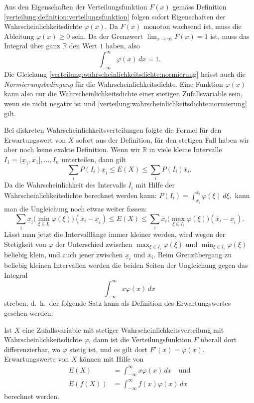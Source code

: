 Aus den Eigenschaften der Verteilungsfunktion $F(x)$
gemäss Definition \ref{verteilung:definition:verteilungsfunktion}
folgen sofort Eigenschaften der Wahrscheinlichkeitsdichte $\varphi(x)$.
Da $F(x)$ monoton wachsend ist, muss die Ableitung $\varphi(x)\ge 0$
sein.
Da der Grenzwert $\lim_{x\to\infty}F(x)=1$ ist, muss das Integral
über ganz $\mathbb{R}$ den Wert $1$ haben, also
\begin{equation}
\int_{-\infty}^\infty \varphi(x)\,dx = 1.
\label{verteilung:wahrscheinlichkeitsdichte:normierung}
\end{equation}
Die Gleichung \eqref{verteilung:wahrscheinlichkeitsdichte:normierung}
heisst auch die {\em Normierungsbedingung} für die Wahrscheinlichkeitsdichte.
Eine Funktion $\varphi(x)$ kann also nur die Wahrscheinlichkeitsdichte
einer stetigen Zufallsvariable sein, wenn sie nicht negativ ist und
\eqref{verteilung:wahrscheinlichkeitsdichte:normierung} gilt.

Bei diskreten Wahrscheinlichkeitsverteilungen folgte die Formel für den
Erwartungswert von $X$ sofort aus der Definition, für den stetigen
Fall haben wir aber noch keine exakte Definition.
Wenn wir $\mathbb{R}$
in viele kleine Intervalle $I_1=(\underline x_1,\overline x_1],\dots, I_n$
unterteilen, dann gilt
\[
\sum_{i}P(I_i)\underline x_i\le
E(X)
\le
\sum_{i}P(I_i)\overline x_i.
\]
Da die Wahrscheinlichkeit des Intervalls $I_i$ mit Hilfe der
Wahrscheinlichkeitsdichte berechnet werden kann:
$P(I_i)=\int_{\underline x_i}^{\overline x_i}\varphi(\xi)\,d\xi,$
kann man die Ungleichung noch etwas weiter fassen:
\[
\sum_{i}\underline x_i\bigl(\min_{\xi\in I_i}\varphi(\xi)\bigr)(\overline x_i-\underline x_i)\le
E(X)
\le
\sum_{i}\overline x_i\bigl(\max_{\xi\in I_i}\varphi(\xi)\bigr)(\overline x_i-\underline x_i).
\]
Lässt man jetzt die Intervalllänge immer kleiner werden, wird wegen der
Stetigkeit von $\varphi$ der Unterschied zwischen
$\max_{\xi\in I_i}\varphi(\xi)$ und
$\min_{\xi\in I_i}\varphi(\xi)$ beliebig klein, und auch jener
zwischen $\underline x_i$ und $\overline x_i$.
Beim Grenzübergang
zu beliebig kleinen Intervallen werden die beiden Seiten der Ungleichung
gegen das Integral
\[
\int_{-\infty}^{\infty}x\varphi(x)\,dx
\]
streben, d.~h.~der folgende Satz kann als Definition des Erwartungswertes
gesehen werden:
\begin{satz}
Ist $X$ eine Zufallsvariable mit stetiger
Wahrscheinlichkeitsverteilung mit Wahrscheinlichkeitsdichte
$\varphi$, dann
ist die Verteilungsfunktion $F$ überall dort differenzierbar, wo
$\varphi$ stetig ist, und es gilt dort
$F'(x)=\varphi(x)$.
Erwartungswerte von $X$ können mit Hilfe von
\begin{align*}
E(X)&=\int_{-\infty}^{\infty}x\varphi(x)\,dx\quad\text{und}\\
E(f(X))&=\int_{-\infty}^{\infty}f(x)\varphi(x)\,dx
\end{align*}
berechnet werden.
\end{satz}


